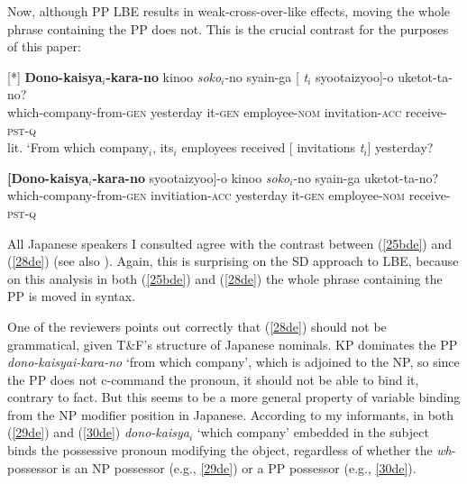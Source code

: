 \documentclass[output=paper]{langscibook}
\begin{document}
Now, although PP LBE results in weak-cross-over-like effects, moving the whole phrase containing the PP does not. This is the crucial contrast for the purposes of this paper:

\begin{exe}
\begin{xlist}
[*]{ 
\gll \textbf{Dono-kaisya}$_{i}$\textbf{-kara-no}  kinoo  \textit{soko}$_{i}$-no syain-ga [ \textit{t}$_{i}$    syootaizyoo]-o uketot-ta-no?\\
which-company-from-\textsc{gen} yesterday it-\textsc{gen} employee-\textsc{nom} {} {} invitation-\textsc{acc} receive-\textsc{pst}-\textsc{q}\\
\glt lit. ‘From which company$_{i}$, its$_{i}$ employees received [ invitations \textit{t}$_{i}$] yesterday?}
\end{xlist}

\ex \label{28de}
\gll \textbf{[Dono-kaisya$_{i}$-kara-no}      syootaizyoo]-o   kinoo       \textit{soko}$_{i}$-no syain-ga             uketot-ta-no?\\
which-company-from-\textsc{gen} invitiation-\textsc{acc} yesterday it-\textsc{gen} employee-\textsc{nom} receive-\textsc{pst}-\textsc{q}\\
\end{exe}



All Japanese speakers I consulted agree with the contrast between (\ref{25bde}) and (\ref{28de}) (see also \citealt{AranoOda2019}). Again, this is surprising on the SD approach to LBE, because on this analysis in both (\ref{25bde}) and (\ref{28de}) the whole phrase containing the PP is moved in syntax.

One of the reviewers points out correctly that (\ref{28de}) should not be grammatical, given T\&F’s structure of Japanese nominals. KP dominates the PP \textit{dono-kaisyai-kara-no} ‘from which company’, which is adjoined to the NP, so since the PP does not c-command the pronoun, it should not be able to bind it, contrary to fact. But this seems to be a more general property of variable binding from the NP modifier position in Japanese. According to my informants, in both (\ref{29de}) and (\ref{30de}) \textit{dono-kaisya}$_{i}$ ‘which company’ embedded in the subject binds the possessive pronoun modifying the object, regardless of whether the \textit{wh}-possessor is an NP possessor (e.g., \ref{29de}) or a PP possessor (e.g., \ref{30de}).
\end{document}
